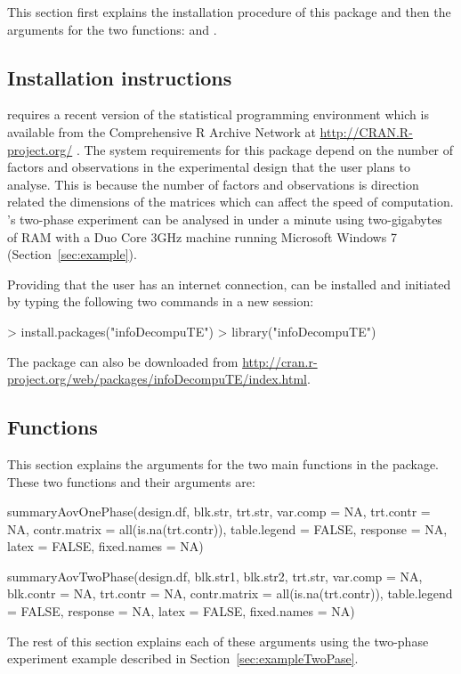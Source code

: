 \documentclass[article]{jss}
\begin{document}
This section first explains the installation procedure of this package and then the arguments for the two functions:  and .

\subsection{Installation instructions}
 requires a recent version of the  statistical programming environment which is available from the Comprehensive R Archive Network at \url{http://CRAN.R-project.org/} \citep{R2012}. The system requirements for this package depend on the number of factors and observations in the experimental design that the user plans to analyse. This is because the number of factors and observations is direction related the dimensions of the matrices which can affect the speed of computation. \citeauthor{Brien1999}'s \citeyearpar{Brien1999} two-phase experiment can be analysed in under a minute using two-gigabytes of RAM with a Duo Core 3GHz machine running Microsoft Windows 7 (Section~\ref{sec:example}).

Providing that the user has an internet connection,  can be installed and initiated by typing the following two commands in a new  session: 
\begin{CodeChunk}
\begin{CodeInput}
> install.packages("infoDecompuTE")
> library("infoDecompuTE")
\end{CodeInput}
\end{CodeChunk}
The package can also be downloaded from \url{http://cran.r-project.org/web/packages/infoDecompuTE/index.html}.


\subsection{Functions}
This section explains the arguments for the two main functions in the  package. These two functions and their arguments are:
\begin{CodeChunk}
\begin{CodeInput}
summaryAovOnePhase(design.df, blk.str, trt.str, var.comp = NA,
                trt.contr = NA, contr.matrix = all(is.na(trt.contr)),
                table.legend = FALSE, response = NA, latex = FALSE,
                fixed.names = NA)
                
summaryAovTwoPhase(design.df, blk.str1, blk.str2, trt.str, var.comp = NA, 
                blk.contr = NA, trt.contr = NA, 
                contr.matrix = all(is.na(trt.contr)),  table.legend = FALSE,
                response = NA, latex = FALSE, fixed.names = NA)
\end{CodeInput}
\end{CodeChunk}
The rest of this section explains each of these arguments using the two-phase experiment example described in Section~\ref{sec:exampleTwoPase}.
\end{document}
